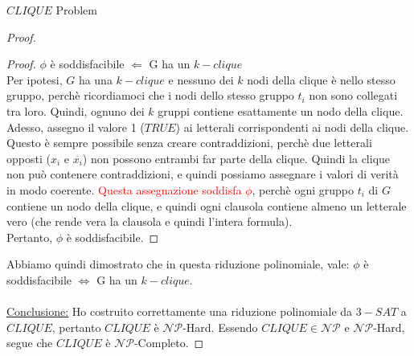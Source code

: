 \documentclass{article}  %
\theoremstyle{definition}
\begin{document}
\begin{theorem}{$CLIQUE$ Problem}
\begin{proof}
\begin{itemize}
			      \begin{proof}
				      $\phi$ è soddisfacibile $\Longleftarrow$ G ha un $k-clique$ \\
				      Per ipotesi, $G$ ha una $k-clique$ e nessuno dei $k$ nodi della clique è nello stesso gruppo, perchè ricordiamoci che i nodi dello stesso gruppo $t_i$ non
				      sono collegati tra loro. Quindi, ognuno dei $k$ gruppi contiene esattamente un nodo della clique. \\
				      Adesso, assegno il valore 1 ($TRUE$) ai letterali corrispondenti ai nodi della clique.
				      Questo è sempre possibile senza creare contraddizioni, perchè due letterali opposti ($x_i$ e $\overline{x_i}$) non possono entrambi far parte della clique.
				      Quindi la clique non può contenere contraddizioni, e quindi possiamo assegnare i valori di verità in modo coerente.
				      \textcolor{red}{Questa assegnazione soddisfa $\phi$}, perchè ogni gruppo $t_i$ di $G$ contiene un nodo della clique, e quindi ogni clausola contiene
				      almeno un letterale vero (che rende vera la clausola e quindi l'intera formula). \\
				      Pertanto, $\phi$ è soddisfacibile.
			      \end{proof}
		\end{itemize}
		Abbiamo quindi dimostrato che in questa riduzione polinomiale, vale:
		$\phi$ è soddisfacibile $\iff$ G ha un $k-clique$. \\ \\

		\underline{Conclusione:} Ho costruito correttamente una riduzione polinomiale da $3-SAT$ a $CLIQUE$, pertanto $CLIQUE$ è $\mathcal{NP}$-Hard.
		Essendo $CLIQUE \in \mathcal{NP}$ e $\mathcal{NP}$-Hard, segue che $CLIQUE$ è $\mathcal{NP}$-Completo.
	\end{proof}
\end{theorem}
\end{document}
